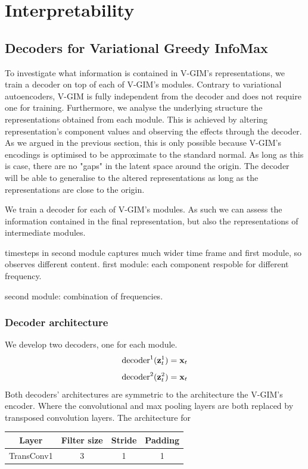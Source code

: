 	


\section{Interpretability}

	\subsection{Decoders for Variational Greedy InfoMax}
		To investigate what information is contained in V-GIM's representations, we train a decoder on top of each of V-GIM's modules. Contrary to variational autoencoders, V-GIM is fully independent from the decoder and does not require one for training. Furthermore, we analyse the underlying structure the representations obtained from each module. This is achieved by altering representation's component values and observing the effects through the decoder. As we argued in the previous section, this is only possible because V-GIM's encodings is optimised to be approximate to the standard normal. As long as this is case, there are no "gaps" in the latent space around the origin. The decoder will be able to generalise to the altered representations as long as the representations are close to the origin.
		
		We train a decoder for each of V-GIM's modules. As such we can assess the information contained in the final representation, but also the representations of intermediate modules.
		
		timesteps in second module captures much wider time frame and first module, so observes different content.
		first module: each component respoble for different frequency.
		
		second module:
		combination of frequencies.
		
		\subsubsection{Decoder architecture}
		We develop two decoders, one for each module. 
		$$
			\text{decoder}^1(\mathbf{z}_t^1) = \mathbf{x}_t
		$$
		$$
			\text{decoder}^2(\mathbf{z}_t^2) = \mathbf{x}_t
		$$
		Both decoders' architectures are symmetric to the architecture the V-GIM's encoder. Where the convolutional and max pooling layers are both replaced by transposed convolution layers.
		The architecture for 
		
		\begin{tabular}{|c|c|c|c|}
			\hline
			Layer & Filter size & Stride & Padding \\
			\hline
			TransConv1 & 3 & 1 & 1 \\
			\hline
		\end{tabular}
	
